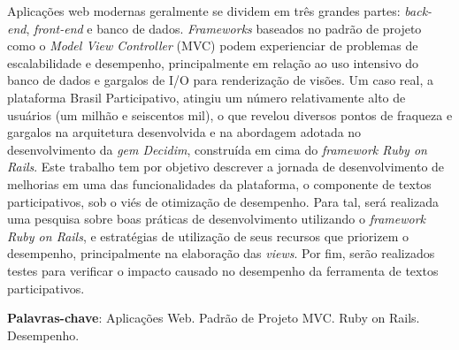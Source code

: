 \begin{resumo}
  Aplicações web modernas geralmente se dividem em três grandes partes: \textit{back-end}, \textit{front-end} e banco de dados. \textit{Frameworks} baseados no padrão de projeto como o \textit{Model View Controller} (MVC) podem experienciar de problemas de escalabilidade e desempenho, principalmente em relação ao uso intensivo do banco de dados e gargalos de I/O para renderização de visões. Um caso real, a plataforma Brasil Participativo, atingiu um número relativamente alto de usuários (um milhão e seiscentos mil), o que revelou diversos pontos de fraqueza e gargalos na arquitetura desenvolvida e na abordagem adotada no desenvolvimento da \textit{gem Decidim}, construída em cima do \textit{framework Ruby on Rails}. Este trabalho tem por objetivo descrever a jornada de desenvolvimento de melhorias em uma das funcionalidades da plataforma, o componente de textos participativos, sob o viés de otimização de desempenho. Para tal, será realizada uma pesquisa sobre boas práticas de desenvolvimento utilizando o \textit{framework Ruby on Rails}, e estratégias de utilização de seus recursos que priorizem o desempenho, principalmente na elaboração das \textit{views}. Por fim, serão realizados testes para verificar o impacto causado no desempenho da ferramenta de textos participativos.

   \vspace{\onelineskip}

   \noindent
   \textbf{Palavras-chave}: Aplicações Web. Padrão de Projeto MVC. Ruby on Rails. Desempenho.
  \end{resumo}
